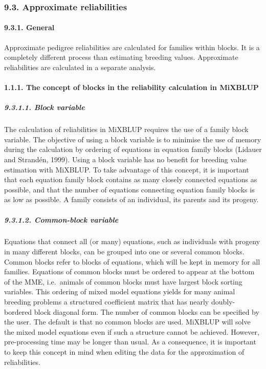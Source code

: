 \subsubsection{9.3. Approximate reliabilities}\label{Reli07}

\paragraph{9.3.1. General}\label{Reli08}

Approximate pedigree reliabilities are calculated for families within
blocks. It is a completely different process than estimating breeding
values. Approximate reliabilities are calculated in a separate analysis.

\paragraph{1.1.1. The concept of blocks in the reliability calculation
in MiXBLUP}\label{Reli09}

\subparagraph{9.3.1.1. Block variable}\label{Reli10}

The calculation of reliabilities in MiXBLUP requires the use of a family
block variable. The objective of using a block variable is to minimise
the use of memory during the calculation by ordering of equations in
equation family blocks (Lidauer and Strandén, 1999). Using a block
variable has no benefit for breeding value estimation with MiXBLUP. To
take advantage of this concept, it is important that each equation
family block contains as many closely connected equations as possible,
and that the number of equations connecting equation family blocks is as
low as possible. A family consists of an individual, its parents and its
progeny.

\subparagraph{9.3.1.2. Common-block variable}\label{Reli11}

Equations that connect all (or many) equations, such as individuals with
progeny in many different blocks, can be grouped into one or several
common blocks. Common blocks refer to blocks of equations, which will be
kept in memory for all families. Equations of common blocks must be
ordered to appear at the bottom of the MME, i.e.~animals of common
blocks must have largest block sorting variables. This ordering of mixed
model equations yields for many animal breeding problems a structured
coefficient matrix that has nearly doubly-bordered block diagonal form.
The number of common blocks can be specified by the user. The default is
that no common blocks are used. MiXBLUP will solve the mixed model
equations even if such a structure cannot be achieved. However,
pre-processing time may be longer than usual. As a consequence, it is
important to keep this concept in mind when editing the data for the
approximation of reliabilities.

